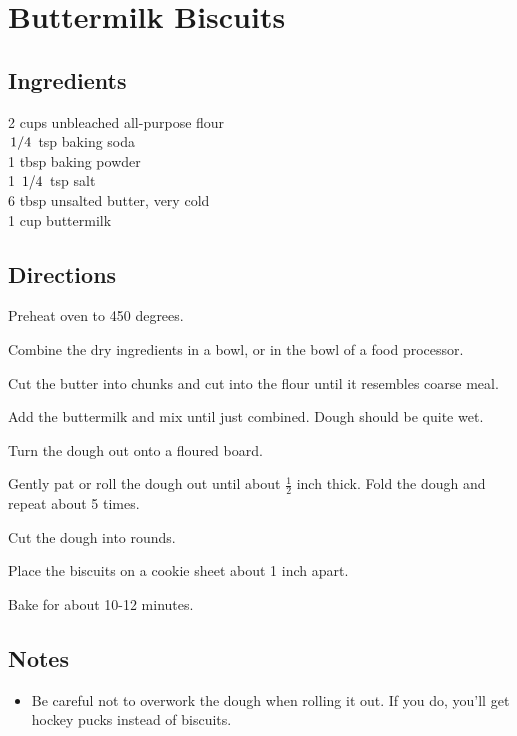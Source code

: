 \documentclass{article}
\newcounter{qcounter}
\begin{document}
\newcommand{\slfrac}[2]{\left.#1\middle/#2\right.}
\newcommand{\degree}{\ensuremath{^\circ}}

\section*{Buttermilk Biscuits}



\subsection*{Ingredients}
2 cups unbleached all-purpose flour\\
$\slfrac{1}{4}$ tsp baking soda\\
1 tbsp baking powder\\
1 $\slfrac{1}{4}$ tsp salt\\
6 tbsp unsalted butter, very cold\\
1 cup buttermilk\\

\subsection*{Directions}
\begin{list}{:~}{}

\item Preheat oven to 450 degrees.
\item Combine the dry ingredients in a bowl, or in the bowl of a food processor.
\item Cut the butter into chunks and cut into the flour until it resembles coarse meal.
\item Add the buttermilk and mix until just combined. Dough should be quite wet.
\item Turn the dough out onto a floured board.
\item Gently pat or roll the dough out until about $\frac{1}{2}$ inch thick.  Fold the dough and repeat about 5 times.
\item Cut the dough into rounds.
\item Place the biscuits on a cookie sheet about 1 inch apart.
\item Bake for about 10-12 minutes.
\end{list}

\subsection*{Notes}
\begin{itemize}
\item Be careful not to overwork the dough when rolling it out. If you do, you'll get hockey pucks instead of biscuits.
\end{itemize}
\end{document}

